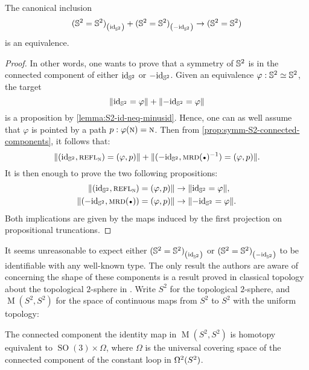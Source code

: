 \documentclass[english,a4paper]{lmcs}
\begin{document}
\begin{prop}
  The canonical inclusion
  \begin{displaymath}
    {({{\mathbb S^{2}}}= {{\mathbb S^{2}}})}_{\left(\mathord{\mathrm{id}}_{{\mathbb S^{2}}}\right)} + {({{\mathbb S^{2}}} = {{\mathbb S^{2}}})}_{\left(-\mathord{\mathrm{id}}_{{\mathbb S^{2}}}\right)} \to ({{\mathbb S^{2}}} = {{\mathbb S^{2}}})
  \end{displaymath}
  is an equivalence.
  \label{prop:symm-S2-connected-components}
\end{prop}
\begin{proof}
  In other words, one wants to prove that a symmetry of ${{\mathbb S^{2}}}$ is in the
  connected component of either $\mathord{\mathrm{id}}_{{\mathbb S^{2}}}$ or $-\mathord{\mathrm{id}}_{{\mathbb S^{2}}}$. Given an equivalence
  $\varphi:{{\mathbb S^{2}}} \simeq {{\mathbb S^{2}}}$, the target
  \begin{displaymath}
    \lVert\mathord{\mathrm{id}}_{{\mathbb S^{2}}} = \varphi\rVert + \lVert-\mathord{\mathrm{id}}_{{\mathbb S^{2}}} = \varphi\rVert
  \end{displaymath}
  is a proposition by \cref{lemma:S2-id-neq-minusid}. Hence, one can as well
  assume that $\varphi$ is pointed by a path $p:\varphi(\textsc{n}) = \textsc{n}$. Then from
  \cref{prop:symm-S2-connected-components}, it follows that:
  \begin{displaymath}
    \Trunc{(\id_\Sp,\refl\north) = (\varphi, p)} + \Trunc{(-\id_\Sp,\inv{\mrd(\base)}) = (\varphi, p)}.
  \end{displaymath}
  It is then enough to prove the two following propositions:
  \begin{align*}
    \Trunc{(\id_\Sp,\refl\north) = (\varphi, p)} &\to \Trunc{\id_\Sp = \varphi},
    \\
    \Trunc{(-\id_\Sp,\mrd(\base)) = (\varphi, p)} &\to \Trunc{-\id_\Sp = \varphi}.
  \end{align*}
  Both implications are given by the maps induced by the first projection on
  propositional truncations.
\end{proof}

It seems unreasonable to expect either ${({{\mathbb S^{2}}} = {{\mathbb S^{2}}})}_{\left(\mathord{\mathrm{id}}_{{\mathbb S^{2}}}\right)}$ or
${({{\mathbb S^{2}}} = {{\mathbb S^{2}}})}_{\left(-\mathord{\mathrm{id}}_{{\mathbb S^{2}}}\right)}$ to be identifiable with any well-known type.
%
\newcommand{\topSp}{S^2}%
The only result the authors are aware of concerning the shape of these
components is a result proved in classical topology about the topological
$2$-sphere in \cite[Thm.~4.1]{hansen}. Write $\topSp$ for the topological
$2$-sphere, and $\operatorname M(\topSp,\topSp)$ for the space of continuous
maps from $\topSp$ to $\topSp$ with the uniform topology:
\begin{thm}
  The connected component the identity map in $\operatorname M(\topSp,\topSp)$
  is homotopy equivalent to $\operatorname{SO}(3)\times \Omega$, where $\Omega$
  is the universal covering space of the connected component of the constant
  loop in $\loopspace 2 (\topSp)$.
  \label{thm:hansen}
\end{thm}
\end{document}
